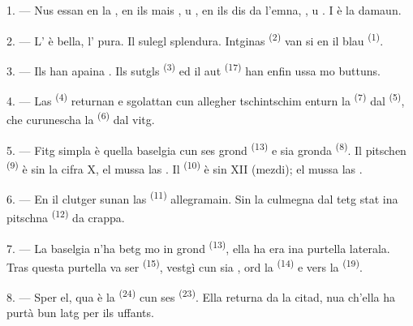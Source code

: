 \VUsaut{4.0mm}
\VUsaut{3.0mm}

\VUsaut{2.4mm}

\VUsaut{3.0mm}

1. --- Nus essan en la , en ils mais ,  u
, en ils dis da l'emna, ,  u
. I è  la damaun.

2. --- L' è bella, l' pura. Il sulegl splendura. Intginas
 \textsuperscript{(2)} van si en il blau 
\textsuperscript{(1)}.

3. --- Ils  han apaina . Ils sutgls 
\textsuperscript{(3)} ed il aut  \textsuperscript{(17)} han enfin ussa mo
buttuns.

4. --- Las  \textsuperscript{(4)} returnan e sgolattan cun allegher
tschintschim enturn la  \textsuperscript{(7)} dal 
\textsuperscript{(5)}, che curunescha la  \textsuperscript{(6)} dal vitg.

\VUsaut{3.4mm}
\VUsaut{3.0mm}

5. --- Fitg simpla è quella baselgia cun ses grond 
\textsuperscript{(13)} e sia gronda  \textsuperscript{(8)}. Il pitschen
 \textsuperscript{(9)} è sin la cifra X, el mussa las . Il
 \textsuperscript{(10)} è sin XII (mezdi); el mussa las .

6. --- En il clutger sunan las  \textsuperscript{(11)} allegramain. Sin
la culmegna dal tetg stat ina pitschna  \textsuperscript{(12)} da crappa.

7. --- La baselgia n'ha betg mo in grond  \textsuperscript{(13)}, ella ha
era ina purtella laterala. Tras questa purtella va ser 
\textsuperscript{(15)}, vestgì cun sia , ord la 
\textsuperscript{(14)} e vers la  \textsuperscript{(19)}.

8. --- Sper el, qua è la  \textsuperscript{(24)} cun ses
 \textsuperscript{(23)}. Ella returna da la citad, nua ch'ella ha purtà bun
latg per ils uffants.

